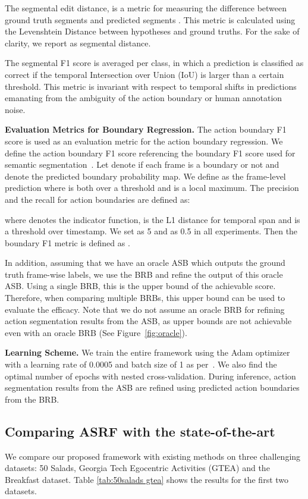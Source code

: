 \documentclass[10pt,twocolumn,letterpaper]{article}
\begin{document}
The segmental edit distance,  is a metric for measuring the difference between ground truth segments  and predicted segments .
This metric is calculated using the Levenshtein Distance\cite{levenshtein} between hypotheses and ground truths.
For the sake of clarity, we report  as segmental distance.

The segmental F1 score is averaged per class, in which a prediction is classified as correct if the temporal Intersection over Union (IoU) is larger than a certain threshold.
This metric is invariant with respect to temporal shifts in predictions emanating from the ambiguity of the action boundary or human annotation noise.


\textbf{Evaluation Metrics for Boundary Regression.}
The action boundary F1 score is used as an evaluation metric for the action boundary regression.
We define the action boundary F1 score referencing the boundary F1 score used for semantic segmentation~\cite{boundaryf1}.
Let  denote if each frame is a boundary or not and  denote the predicted boundary probability map.
We define  as the frame-level prediction where  is both over a threshold  and is a local maximum.
The precision and the recall for action boundaries are defined as:

where  denotes the indicator function,  is the L1 distance for temporal span and  is a threshold over timestamp.
We set  as 5 and  as 0.5 in all experiments.
Then the boundary F1 metric is defined as .


In addition, assuming that we have an oracle ASB which outputs the ground truth frame-wise labels,
we use the BRB and refine the output of this oracle ASB.
Using a single BRB, this is the upper bound of the achievable score.
Therefore, when comparing multiple BRBs, this upper bound can be used to evaluate the efficacy. 
Note that we do not assume an oracle BRB for refining action segmentation results from the ASB, as upper bounds are not achievable even with an oracle BRB (See Figure~\ref{fig:oracle}).



\textbf{Learning Scheme.}
We train the entire framework using the Adam optimizer with a learning rate of 0.0005 and batch size of 1 as per~\cite{mstcn}.
We also find the optimal number of epochs with nested cross-validation.
During inference, action segmentation results from the ASB are refined using predicted action boundaries from the BRB. 




\subsection{Comparing ASRF with the state-of-the-art}
\label{sec:sota}
We compare our proposed framework with existing methods on three challenging datasets: 50 Salads, Georgia Tech Egocentric Activities (GTEA) and the Breakfast dataset. 
Table \ref{tab:50salads gtea} shows the results for the first two datasets.
\end{document}
